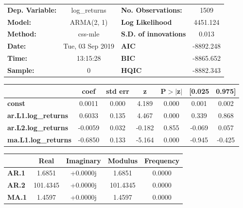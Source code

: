 \begin{center}
\begin{tabular}{lclc}
\toprule
\textbf{Dep. Variable:}     &        log\_returns       & \textbf{  No. Observations:  } &            1509            \\
\textbf{Model:}             &         ARMA(2, 1)        & \textbf{  Log Likelihood     } &          4451.124          \\
\textbf{Method:}            &          css-mle          & \textbf{  S.D. of innovations} &           0.013            \\
\textbf{Date:}              &      Tue, 03 Sep 2019     & \textbf{  AIC                } &         -8892.248          \\
\textbf{Time:}              &          13:15:28         & \textbf{  BIC                } &         -8865.652          \\
\textbf{Sample:}            &             0             & \textbf{  HQIC               } &         -8882.343          \\
\bottomrule
\end{tabular}
\begin{tabular}{lcccccc}
                            & \textbf{coef} & \textbf{std err} & \textbf{z} & \textbf{P$> |$z$|$} & \textbf{[0.025} & \textbf{0.975]}  \\
\midrule
\textbf{const}              &       0.0011  &        0.000     &     4.189  &         0.000        &        0.001    &        0.002     \\
\textbf{ar.L1.log\_returns} &       0.6033  &        0.135     &     4.467  &         0.000        &        0.339    &        0.868     \\
\textbf{ar.L2.log\_returns} &      -0.0059  &        0.032     &    -0.182  &         0.855        &       -0.069    &        0.057     \\
\textbf{ma.L1.log\_returns} &      -0.6850  &        0.133     &    -5.164  &         0.000        &       -0.945    &       -0.425     \\
\bottomrule
\end{tabular}
\begin{tabular}{lcccc}
              & \textbf{            Real} & \textbf{         Imaginary} & \textbf{         Modulus} & \textbf{        Frequency}  \\
\midrule
\textbf{AR.1} &                1.6851     &                +0.0000j     &                1.6851     &                0.0000       \\
\textbf{AR.2} &              101.4345     &                +0.0000j     &              101.4345     &                0.0000       \\
\textbf{MA.1} &                1.4597     &                +0.0000j     &                1.4597     &                0.0000       \\
\bottomrule
\end{tabular}
\end{center}
